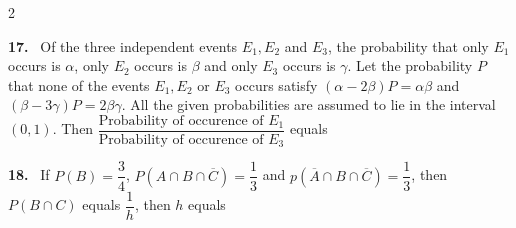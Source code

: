 \documentclass[10pt]{extarticle}
\newcommand{\qn}[1]{\par\smallskip\noindent\textbf{#1.}~}
\begin{document}
\begin{multicols}{2}
\qn{17} Of the three independent events $E_1,E_2$ and $E_3$, the probability that only $E_1$ occurs is $\alpha$, only $E_2$ occurs is $\beta$ and only $E_3$ occurs is $\gamma$. Let the probability $P$ that none of the events $E_1,E_2$ or $E_3$ occurs satisfy $(\alpha-2\beta)P=\alpha\beta$ and $(\beta-3\gamma)P=2\beta\gamma$. All the given probabilities are assumed to lie in the interval $(0,1)$. Then $\dfrac{\text{Probability of occurence of }E_1}{\text{Probability of occurence of }E_3}$ equals \underline{\hspace{1.5cm}}
\qn{18} If $P(B)=\dfrac34$, $P\left(A\cap B\cap\overline C\right)=\dfrac13$ and $p\left(\overline A\cap B\cap\overline C\right)=\dfrac13$, then $P(B\cap C)$ equals $\dfrac1h$, then $h$ equals \underline{\hspace{1.5cm}}
\end{multicols}
\end{document}

